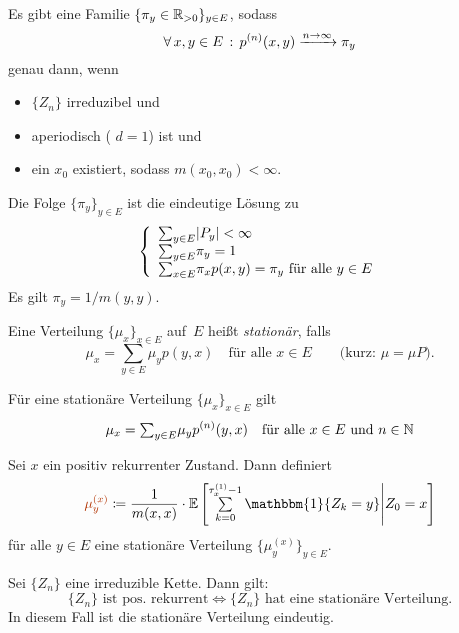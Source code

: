 \documentclass{cheat-sheet}
\newcommand{\E}{\mathbb{E}} %
\newcommand{\ind}{\mathbbm{1}} %
\newcommand{\Defn}[1]{\textcolor{DefinitionColor}{#1}}
\begin{document}
\begin{satz}
  Es gibt eine Familie $\{ \pi_y \in \mathbb{R}_{> 0} \}_{y \in E}$, sodass
  \[ \forall \, {x, y \in E} \,:\, p^{(n)}(x, y) \xrightarrow{n \to \infty} \pi_y \]
  genau dann, wenn
  \begin{itemize}
    \item $\{ Z_n \}$ irreduzibel und
    \item aperiodisch (\dh{} $d = 1$) ist und
    \item ein $x_0$ existiert, sodass $m(x_0, x_0) < \infty$.
  \end{itemize}
  Die Folge $\{ \pi_y \}_{y \in E}$ ist die eindeutige Lösung zu
  \[
    \left\{
      \begin{array}{l}
        {\sum}_{y \in E} \abs{P_y} < \infty \\
        {\sum}_{y \in E} \pi_y = 1 \\
        {\sum}_{x \in E} \pi_x p(x, y) = \pi_y \text{ für alle } y \in E
      \end{array}
    \right.
  \]
  Es gilt $\pi_y = 1/m(y,y)$.
\end{satz}


\begin{defn}
  Eine Verteilung $\{ \mu_x \}_{x \in E}$ auf~$E$ heißt \emph{stationär}, falls
  \[
    \mu_x = {\sum}_{y \in E} \mu_y p(y, x)
    \quad \text{für alle $x \in E$}
    \qquad \text{(kurz: $\mu = \mu P$).}
  \]
\end{defn}

\begin{bem}
  Für eine stationäre Verteilung $\{ \mu_x \}_{x \in E}$ gilt
  \[
    \mu_x = {\sum}_{y \in E} \mu_y p^{(n)}(y, x)
    \quad \text{für alle $x \in E$ und $n \in \N$}
  \]
\end{bem}

\begin{lem}
  Sei $x$ ein positiv rekurrenter Zustand.
  Dann definiert
  \[
    \Defn{\mu_y^{(x)}} \coloneqq \frac{1}{m(x, x)} \cdot \E \left[ \sum_{k=0}^{\tau_x^{(1)} - 1} \ind \{ Z_k = y \} \middle| Z_0 = x \right]
  \]
  für alle $y \in E$ eine stationäre Verteilung $\{ \mu_y^{(x)} \}_{y \in E}$.
\end{lem}

\begin{satz}
  Sei $\{ Z_n \}$ eine irreduzible Kette.
  Dann gilt:
  \[
    \{ Z_n \} \text{ ist pos. rekurrent} \iff
    \{ Z_n \} \text{ hat eine stationäre Verteilung.}
  \]
  In diesem Fall ist die stationäre Verteilung eindeutig.
\end{satz}
\end{document}
